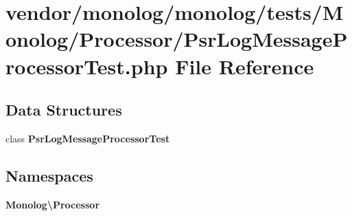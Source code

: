 \section{vendor/monolog/monolog/tests/\+Monolog/\+Processor/\+Psr\+Log\+Message\+Processor\+Test.php File Reference}
\label{_psr_log_message_processor_test_8php}
\subsection*{Data Structures}
\begin{DoxyCompactItemize}
\item 
class {\bf Psr\+Log\+Message\+Processor\+Test}
\end{DoxyCompactItemize}
\subsection*{Namespaces}
\begin{DoxyCompactItemize}
\item 
 {\bf Monolog\textbackslash{}\+Processor}
\end{DoxyCompactItemize}
